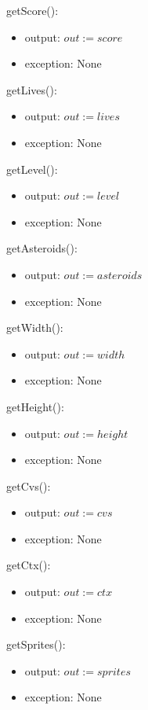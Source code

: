 \documentclass[12pt]{article}
\begin{document}
getScore():
\begin{itemize}
    \item output: $out := score$
    \item exception: None
\end{itemize}

getLives():
\begin{itemize}
    \item output: $out := lives$
    \item exception: None
\end{itemize}

getLevel():
\begin{itemize}
    \item output: $out := level$
    \item exception: None
\end{itemize}

getAsteroids():
\begin{itemize}
    \item output: $out := asteroids$
    \item exception: None
\end{itemize}

getWidth():
\begin{itemize}
    \item output: $out := width$
    \item exception: None
\end{itemize}

getHeight():
\begin{itemize}
    \item output: $out := height$
    \item exception: None
\end{itemize}

getCvs():
\begin{itemize}
    \item output: $out := cvs$
    \item exception: None
\end{itemize}

getCtx():
\begin{itemize}
    \item output: $out := ctx$
    \item exception: None
\end{itemize}

getSprites():
\begin{itemize}
    \item output: $out := sprites$
    \item exception: None
\end{itemize}
\end{document}

